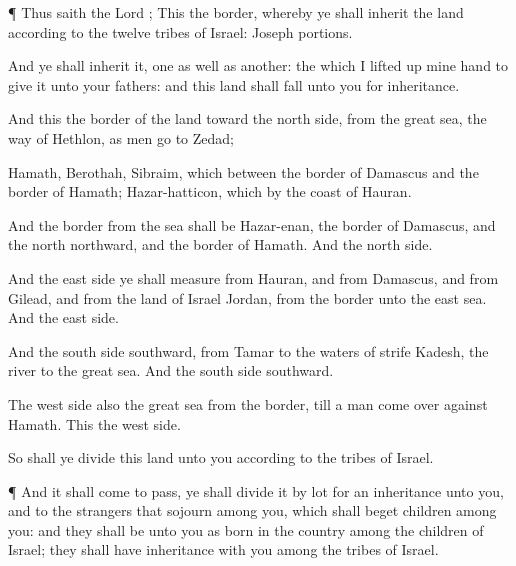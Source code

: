 {\par }{\PP {}¶ Thus
saith the
Lord
{};
This
{} the
border, whereby ye shall
inherit the
land according to the
twelve
tribes of
Israel:
Joseph
{}
portions.

And ye shall
inherit it,
one as well as
another:
{} the which I lifted
up mine
hand to
give it unto your
fathers: and this
land shall
fall unto you for
inheritance.

And this
{} the
border of the
land toward the
north
side, from the
great
sea, the
way of
Hethlon, as men
go to
Zedad;

Hamath,
Berothah,
Sibraim, which
{} between the
border of
Damascus and the
border of
Hamath;
Hazar-hatticon, which
{} by the
coast of
Hauran.

And the
border from the
sea shall be
Hazar-enan, the
border of
Damascus, and the
north
northward, and the
border of
Hamath. And
{} the
north
side.

And the
east
side ye shall
measure
from
Hauran, and
from
Damascus, and
from
Gilead, and
from the
land of
Israel
{}
Jordan, from the
border unto the
east
sea. And
{} the
east
side.

And the
south
side
southward, from
Tamar
{} to the
waters of
strife
{}
Kadesh, the
river to the
great
sea. And
{} the
south
side
southward.

The
west
side also
{} the
great
sea from the
border, till a man
come over
against
Hamath. This
{} the
west
side.

So shall ye
divide this
land unto you according to the
tribes of
Israel.


\par }{\PP {}¶ And it shall come to pass,
{} ye shall
divide it by lot for an
inheritance unto you, and to the
strangers that
sojourn
among you, which shall
beget
children
among you: and they shall be unto you as
born in the
country among the
children of
Israel; they shall
have
inheritance with you
among the
tribes of
Israel.

}

